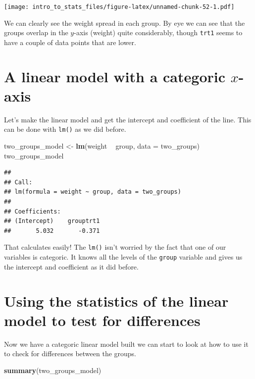 \documentclass[
]{book}
\newenvironment{Shaded}{\begin{snugshade}}{\end{snugshade}}
\newcommand{\DataTypeTok}[1]{\textcolor[rgb]{0.13,0.29,0.53}{#1}}
\newcommand{\KeywordTok}[1]{\textcolor[rgb]{0.13,0.29,0.53}{\textbf{#1}}}
\newcommand{\NormalTok}[1]{#1}
\newcommand{\OperatorTok}[1]{\textcolor[rgb]{0.81,0.36,0.00}{\textbf{#1}}}
\newcommand{\StringTok}[1]{\textcolor[rgb]{0.31,0.60,0.02}{#1}}
\begin{document}
\texttt{[image: intro\_to\_stats\_files/figure-latex/unnamed-chunk-52-1.pdf]}

We can clearly see the weight spread in each group. By eye we can see that the groups overlap in the \(y\)-axis (weight) quite considerably, though \texttt{trt1} seems to have a couple of data points that are lower.

\hypertarget{a-linear-model-with-a-categoric-x-axis}{%
\section{\texorpdfstring{A linear model with a categoric \(x\)-axis}{A linear model with a categoric x-axis}}\label{a-linear-model-with-a-categoric-x-axis}}

Let's make the linear model and get the intercept and coefficient of the line. This can be done with \texttt{lm()} as we did before.

\begin{Shaded}
\begin{Highlighting}[]
\NormalTok{two_groups_model <-}\StringTok{ }\KeywordTok{lm}\NormalTok{(weight }\OperatorTok{~}\StringTok{ }\NormalTok{group, }\DataTypeTok{data =}\NormalTok{ two_groups)}
\NormalTok{two_groups_model}
\end{Highlighting}
\end{Shaded}

\begin{verbatim}
## 
## Call:
## lm(formula = weight ~ group, data = two_groups)
## 
## Coefficients:
## (Intercept)    grouptrt1  
##       5.032       -0.371
\end{verbatim}

That calculates easily! The \texttt{lm()} isn't worried by the fact that one of our variables is categoric. It knows all the levels of the \texttt{group} variable and gives us the intercept and coefficient as it did before.

\hypertarget{using-the-statistics-of-the-linear-model-to-test-for-differences}{%
\section{Using the statistics of the linear model to test for differences}\label{using-the-statistics-of-the-linear-model-to-test-for-differences}}

Now we have a categoric linear model built we can start to look at how to use it to check for differences between the groups.

\begin{Shaded}
\begin{Highlighting}[]
\KeywordTok{summary}\NormalTok{(two_groups_model)}
\end{Highlighting}
\end{Shaded}
\end{document}
